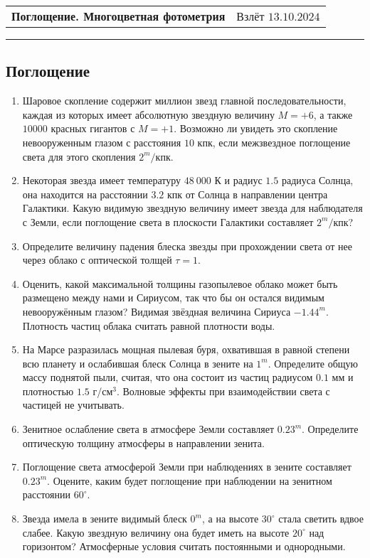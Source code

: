 \documentclass[12pt]{article}
\begin{document}
 \begin{tabularx}{\textwidth}{Xr}
  {\Large \textbf{Поглощение. Многоцветная фотометрия}} & Взлёт $13.10.2024$ \\
 \end{tabularx}
 \noindent\rule{\textwidth}{0.4pt}
 \subsection*{Поглощение}
 \begin{enumerate}
    \item Шаровое скопление содержит миллион звезд главной последовательности, каждая из которых имеет абсолютную звездную величину $M=+6$, а также $10 000$ красных гигантов с $M=+1$. Возможно ли увидеть это скопление невооруженным глазом с расстояния $10$ кпк, если межзвездное поглощение света для этого скопления $2^m \mbox{/кпк}$.
    \item Некоторая звезда имеет температуру $48~000$ К и радиус $1.5$ радиуса Солнца, она находится на расстоянии $3.2$ кпк от Солнца в направлении центра Галактики. Какую видимую звездную величину имеет звезда для наблюдателя с Земли, если поглощение света в плоскости Галактики составляет $2^m/\mbox{кпк}$?
    \item Определите величину падения блеска звезды при прохождении света от нее через облако с оптической толщей $\tau=1$.
    \item Оценить, какой максимальной толщины газопылевое облако может быть размещено между нами и Сириусом, так что бы он остался видимым невооружённым глазом? Видимая звёздная величина Сириуса $-1.44^m$. Плотность частиц облака считать равной плотности воды.
    \item На Марсе разразилась мощная пылевая буря, охватившая в равной степени всю планету и ослабившая блеск Солнца в зените на $1^m$. Определите общую массу поднятой пыли, считая, что она состоит из частиц радиусом $0.1$ мм и плотностью $1.5$ г/см$^3$. Волновые эффекты при взаимодействии света с частицей не учитывать.
    \item Зенитное ослабление света в атмосфере Земли составляет $0.23^m$. Определите оптическую толщину атмосферы в направлении зенита. 
    \item Поглощение света атмосферой Земли при наблюдениях в зените составляет $0.23^m$. Оцените, каким будет поглощение при наблюдении на зенитном расстоянии $60^{\circ}$. 
    \item Звезда имела в зените видимый блеск $0^m$, а на высоте $30^{\circ}$ стала светить вдвое слабее. Какую звездную величину она будет иметь на высоте $20^{\circ}$ над горизонтом? Атмосферные условия считать постоянными и однородными.
 \end{enumerate}
 \newpage
\end{document}
